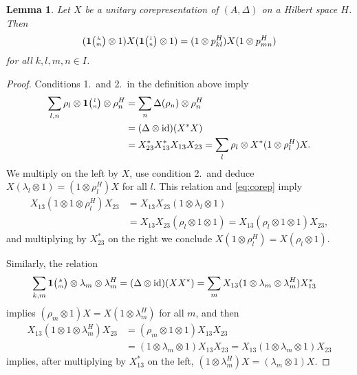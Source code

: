 \documentclass[11pt]{article}
\DeclareMathOperator{\id}{id}
\newcommand{\Grt}[3]{#1{\tiny {\begin{pmatrix} #2\\#3\end{pmatrix}}}}
\newcommand{\UnitC}[2]{\Grt{\mathbf{1}}{#1}{#2}}
\newtheorem{Lem}[Theorem]{Lemma}
\theoremstyle{definition}
\numberwithin{equation}{section}
\begin{document}
\begin{Lem} \label{lem:corep-intertwine}
 Let $X$ be a unitary corepresentation of $(A,\Delta)$ on a Hilbert space $H$. Then  
    \begin{align*}
      (\UnitC{k}{m} \otimes 1)X(\UnitC{l}{n} \otimes 1) = (1 \otimes p^{H}_{kl})X(1 \otimes
      p^{H}_{mn})
    \end{align*}
   for all $k,l,m,n \in I$.
\end{Lem}
\begin{proof}
 Conditions 1.\ and 2.\ in the definition above imply
  \begin{align*}
 \sum_{l,n} \rho_{l} \otimes
  \UnitC{l}{n} \otimes \rho_{n}^{H} &=
    \sum_{n} \Delta(\rho_{n}) \otimes \rho_{n}^{H} \\ &= (\Delta \otimes
    \id)(X^{*}X) \\ &= X^{*}_{23}X^{*}_{13}X_{13}X_{23}  =
    \sum_{l}\rho_{l} \otimes X^{*}(1 \otimes \rho_{l}^{H})X.
  \end{align*}
  We multiply on the left by $X$, use  condition 2.\, and deduce
  $X(\lambda_{l}\otimes 1)=(1\otimes \rho_{l}^{H})X$ for all $l$.
  This relation and \eqref{eq:corep} imply
 \begin{align*}
   X_{13}(1\otimes 1 \otimes \rho_{l}^{H})X_{23} &=X_{13}X_{23}(1
   \otimes \lambda_{l} \otimes 1) \\ &= X_{13}X_{23}(\rho_{l} \otimes 1
   \otimes 1) = X_{13} (\rho_{l} \otimes 1
   \otimes 1) X_{23},
 \end{align*}
 and multiplying by $X_{23}^{*}$ on the right we conclude $X(1\otimes
 \rho^{H}_{l})=X(\rho_{l} \otimes 1)$.


  Similarly,  the relation
  \begin{align*}
    \sum_{k,m} \UnitC{k}{m} \otimes \lambda_{m} \otimes
    \lambda_{m}^{H} &= (\Delta \otimes \id)(XX^{*}) = \sum_{m}
    X_{13}(1 \otimes \lambda_{m} \otimes \lambda_{m}^{H})X_{13}^{*}
  \end{align*}
  implies $(\rho_{m} \otimes 1)X=X(1\otimes \lambda^{H}_{m})$ for all
  $m$, and then
  \begin{align*}
    X_{13}(1 \otimes 1 \otimes \lambda^{H}_{m})X_{23} &= (
    \rho_{m} \otimes 1 \otimes 1)X_{13}X_{23} \\ &= (1\otimes
    \lambda_{m}\otimes 1)X_{13}X_{23} = X_{13}(1 \otimes \lambda_{m}
    \otimes 1)X_{23}
  \end{align*}
  implies, after multiplying by $X_{13}^{*}$ on the left, $(1 \otimes
  \lambda_{m}^{H})X=(\lambda_{m} \otimes 1)X$.
\end{proof}
\end{document}
